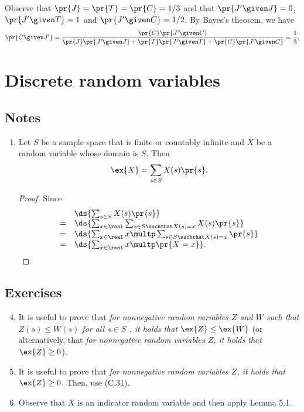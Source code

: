 \begin{enumerate}[\thesection-1]
Observe that $\pr{J} = \pr{T} = \pr{C} = 1/3$ and that $\pr{J' \given J} = 0$, $\pr{J' \given T} = 1$ and $\pr{J' \given C} = 1/2$. By Bayes's theorem, we have
\[
\pr{C \given J'} = \frac{\pr{C} \pr{J' \given C}}{\pr{J} \pr{J' \given J} + \pr{T} \pr{J' \given T} + \pr{C} \pr{J' \given C}} = \frac{1}{3}.
\]
%
\end{enumerate}

\section{Discrete random variables}
\subsection*{Notes}
\begin{enumerate}
%
\item Let $S$ be a sample space that is finite or countably infinite and $X$ be a random variable whose domain is $S$. Then
\[
\ex{X} = \sum_{s \in S} X(s) \pr{s}.
\]
\begin{proof}
Since
\[
\begin{array}{ll}
  & \ds{\sum_{s \in S} X(s) \pr{s}} \cr
= & \ds{\sum_{x \in \real} \sum_{s \in S \suchthat X(s) = x} X(s) \pr{s}} \cr
= & \ds{\sum_{x \in \real} x \multp \sum_{s \in S \suchthat X(s) = x} \pr{s}} \cr
= & \ds{\sum_{x \in \real} x \multp \pr{X = x}}. \cr
\end{array}
\]
\end{proof}
%
\end{enumerate}
\subsection*{Exercises}
\begin{enumerate}[\thesection-1]
%
\setcounter{enumi}{3}
%
\item It is useful to prove that \emph{for nonnegative random variables $Z$ and $W$ such that $Z(s) \leq W(s)$ for all $s \in S$ , it holds that $\ex{Z} \leq \ex{W}$} (or alternatively, that \emph{for nonnegative random variables $Z$, it holds that $\ex{Z} \geq 0$}).
%
\setcounter{enumi}{7}
%
\item It is useful to prove that \emph{for nonnegative random variables $Z$, it holds that $\ex{Z} \geq 0$}. Then, use (C.31).
%
\item Observe that $X$ is an indicator random variable and then apply Lemma 5.1.
%
\end{enumerate}


